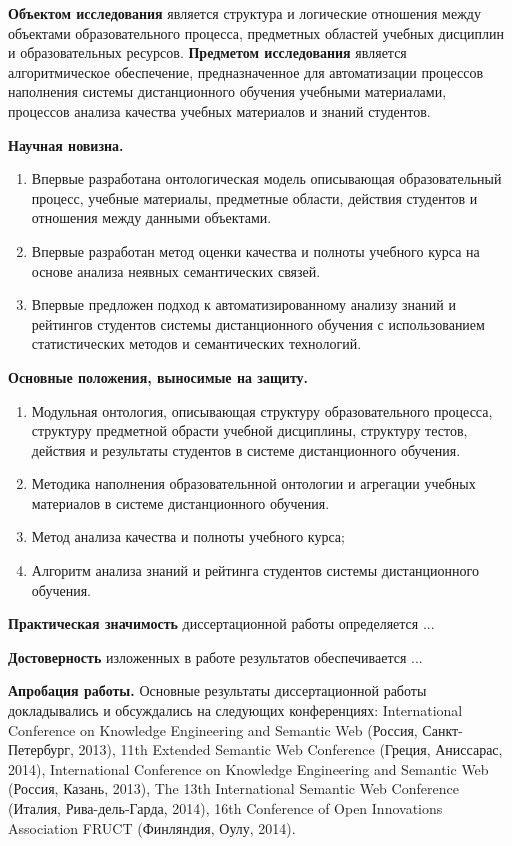 \textbf{Объектом исследования} является структура и логические отношения между объектами образовательного процесса, предметных областей учебных дисциплин и образовательных ресурсов.  
\textbf{Предметом исследования} является алгоритмическое обеспечение, предназначенное для автоматизации процессов наполнения системы дистанционного обучения учебными материалами, процессов анализа качества учебных материалов и знаний студентов. 

\textbf{Научная новизна.}
\begin{enumerate}
 \item Впервые разработана онтологическая модель описывающая образовательный процесс, учебные материалы, предметные области, действия студентов и отношения между данными объектами. 
 \item Впервые разработан метод оценки качества и полноты учебного курса на основе анализа неявных семантических связей.
 \item Впервые предложен подход к автоматизированному анализу знаний и рейтингов студентов системы дистанционного обучения с использованием статистических методов и семантических технологий.
\end{enumerate}

\textbf{Основные положения, выносимые на защиту.}
\begin{enumerate}
 \item Модульная онтология, описывающая структуру образовательного процесса, структуру предметной обрасти учебной дисциплины, структуру тестов, действия и результаты студентов в системе дистанционного обучения.
 \item Методика наполнения образовательнной онтологии и агрегации учебных материалов в системе дистанционного обучения.
 \item Метод анализа качества и полноты учебного курса;
 \item Алгоритм анализа знаний и рейтинга студентов системы дистанционного обучения.
 \end{enumerate}


\textbf{Практическая значимость} диссертационной работы определяется ...

\textbf{Достоверность} изложенных в работе результатов обеспечивается ...



\textbf{Апробация работы.}
Основные результаты диссертационной работы докладывались и обсуждались на следующих конференциях:
International Conference on Knowledge Engineering and Semantic Web (Россия, Санкт-Петербург, 2013),
11th Extended Semantic Web Conference (Греция, Аниссарас, 2014), International Conference on Knowledge Engineering and Semantic Web (Россия, Казань, 2013), The 13th International Semantic Web Conference (Италия, Рива-дель-Гарда, 2014), 16th Conference of Open
Innovations Association FRUCT (Финляндия, Оулу, 2014).

